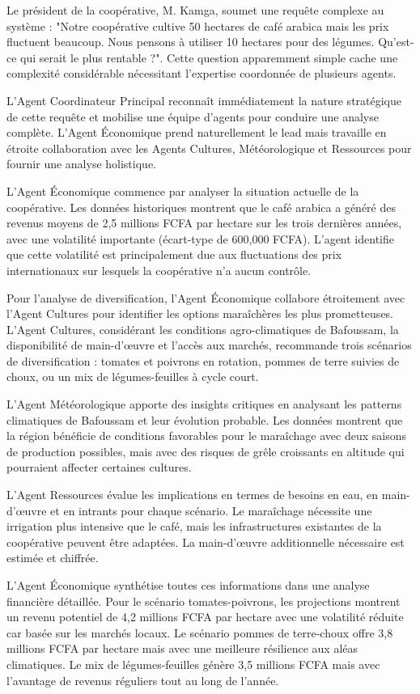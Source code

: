 Le président de la coopérative, M. Kamga, soumet une requête complexe au système : "Notre coopérative cultive 50 hectares de café arabica mais les prix fluctuent beaucoup. Nous pensons à utiliser 10 hectares pour des légumes. Qu'est-ce qui serait le plus rentable ?". Cette question apparemment simple cache une complexité considérable nécessitant l'expertise coordonnée de plusieurs agents.

L'Agent Coordinateur Principal reconnaît immédiatement la nature stratégique de cette requête et mobilise une équipe d'agents pour conduire une analyse complète. L'Agent Économique prend naturellement le lead mais travaille en étroite collaboration avec les Agents Cultures, Météorologique et Ressources pour fournir une analyse holistique.

L'Agent Économique commence par analyser la situation actuelle de la coopérative. Les données historiques montrent que le café arabica a généré des revenus moyens de 2,5 millions FCFA par hectare sur les trois dernières années, avec une volatilité importante (écart-type de 600,000 FCFA). L'agent identifie que cette volatilité est principalement due aux fluctuations des prix internationaux sur lesquels la coopérative n'a aucun contrôle.

Pour l'analyse de diversification, l'Agent Économique collabore étroitement avec l'Agent Cultures pour identifier les options maraîchères les plus prometteuses. L'Agent Cultures, considérant les conditions agro-climatiques de Bafoussam, la disponibilité de main-d'œuvre et l'accès aux marchés, recommande trois scénarios de diversification : tomates et poivrons en rotation, pommes de terre suivies de choux, ou un mix de légumes-feuilles à cycle court.

L'Agent Météorologique apporte des insights critiques en analysant les patterns climatiques de Bafoussam et leur évolution probable. Les données montrent que la région bénéficie de conditions favorables pour le maraîchage avec deux saisons de production possibles, mais avec des risques de grêle croissants en altitude qui pourraient affecter certaines cultures.

L'Agent Ressources évalue les implications en termes de besoins en eau, en main-d'œuvre et en intrants pour chaque scénario. Le maraîchage nécessite une irrigation plus intensive que le café, mais les infrastructures existantes de la coopérative peuvent être adaptées. La main-d'œuvre additionnelle nécessaire est estimée et chiffrée.

L'Agent Économique synthétise toutes ces informations dans une analyse financière détaillée. Pour le scénario tomates-poivrons, les projections montrent un revenu potentiel de 4,2 millions FCFA par hectare avec une volatilité réduite car basée sur les marchés locaux. Le scénario pommes de terre-choux offre 3,8 millions FCFA par hectare mais avec une meilleure résilience aux aléas climatiques. Le mix de légumes-feuilles génère 3,5 millions FCFA mais avec l'avantage de revenus réguliers tout au long de l'année.

